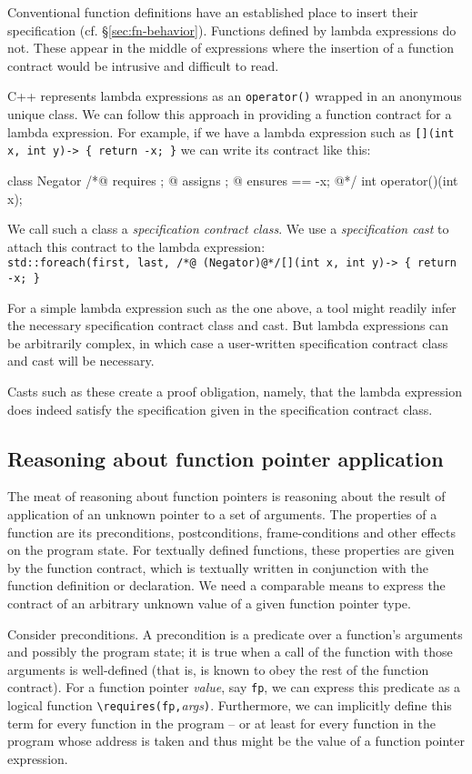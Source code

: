 {Conventional function definitions have an established place to insert their specification (cf. \S\ref{sec:fn-behavior}). Functions defined by lambda expressions do not. These appear in the middle of expressions where the insertion of a function contract would be intrusive and difficult to read.

C++ represents lambda expressions as an \lstinline|operator()| wrapped in an anonymous unique class. We can follow this 
approach in providing a function contract for a lambda expression.  
For example, if we have a lambda expression such as \lstinline|[](int x, int y)-> { return -x; }| we can write its contract like this:
\begin{listing-nonumber}
	class Negator {
		/*@ requires \true;
		  @ assigns \nothing;
		  @ ensures \result == -x;
		  @*/
		int operator()(int x);
	}
\end{listing-nonumber}
We call such a class a \emph{specification contract class}.
We use a \emph{specification cast} to attach this contract to
the lambda expression:\\
\lstinline|std::foreach(first, last, /*@ (Negator)@*/[](int x, int y)-> { return -x; }|

For a simple lambda expression such as the one above, a tool might readily infer the necessary specification contract class and cast. But lambda expressions can be arbitrarily complex, in which case a user-written specification contract class and cast will be necessary.

Casts such as these create a proof obligation, namely, that the 
lambda expression does indeed satisfy the specification given in the
specification contract class.

\subsection{Reasoning about function pointer application}
\label{sec:fpreasoning}
The meat of reasoning about function pointers is reasoning about the result of application of an unknown pointer to a set of arguments. 
The properties of a function are its
preconditions, postconditions, frame-conditions and other effects on the program state. 
For textually defined functions, these properties are given by 
the function contract, which is textually written in
conjunction with the function definition or declaration.
We need a comparable means to express the contract of an
arbitrary unknown value of a given function pointer type.

Consider preconditions. 
A precondition is a predicate over a
function's arguments and possibly the program state; it is 
true when a call of the function with those arguments is 
well-defined (that is, is known to obey the rest of the function contract). 
For a function pointer \emph{value}, say \lstinline|fp|, we can express this predicate as a logical function
\lstinline|\requires(fp,|\emph{args}\lstinline|)|. 
Furthermore, we can implicitly define this term for every function in the program -- or at least for every function in the program whose address is taken and thus might be the value of a function pointer expression.

}
